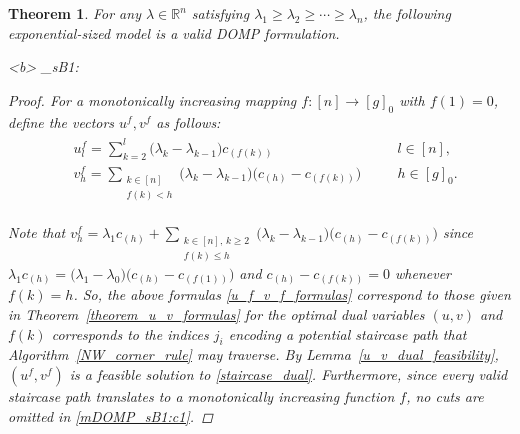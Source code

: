 \documentclass[letterpaper]{article}
\newtheorem{theorem}{Theorem}[section]
\begin{document}
\begin{theorem}\label{transport_domp_formulation}
    For any $\lambda \in \mathbb{R}^n$ satisfying $\lambda_1 \geq \lambda_2 \geq \cdots \geq \lambda_n$, the following exponential-sized model is a valid DOMP formulation.
    \begin{mini!}[2]<b>
        {}
        {\theta}
        {\label{mDOMP_sB1}}{_{sB1}:\,}
    \end{mini!}
    
    \begin{proof}
        For a monotonically increasing mapping $f: [n] \rightarrow [g]_0$ with $f(1) = 0$, define the vectors $u^f, v^f$ as follows:
        \begin{align}\label{u_f_v_f_formulas}
            \begin{alignedat}{2}
                &u^f_l = \sum_{k=2}^{l} \bigl( \lambda_k - \lambda_{k-1} \bigr) c_{(f(k))}& \quad &l \in [n],\\
                &v^f_{h} = \sum_{\substack{k \in [n] \\ f(k) < h}} \bigl( \lambda_{k} - \lambda_{k-1} \bigr) \bigl( c_{(h)} - c_{(f(k))} \bigr) & \quad &h \in [g]_0.
            \end{alignedat}
        \end{align}

        Note that $v^f_{h} = \lambda_1 c_{(h)} + \sum_{\substack{k \in [n], \, k \geq 2 \\ f(k) \leq h}} \bigl( \lambda_{k} - \lambda_{k-1} \bigr) \bigl( c_{(h)} - c_{(f(k))} \bigr)$ since $\lambda_1 c_{(h)} = \bigl( \lambda_{1} - \lambda_{0} \bigr) \bigl( c_{(h)} - c_{(f(1))} \bigr)$ and $c_{(h)} - c_{(f(k))} = 0$ whenever $f(k) = h$. So, the above formulas \eqref{u_f_v_f_formulas} correspond to those given in Theorem~\ref{theorem_u_v_formulas} for the optimal dual variables $(u, v)$ and $f(k)$ corresponds to the indices $j_i$ encoding a potential staircase path that Algorithm~\ref{NW_corner_rule} may traverse. By Lemma~\ref{u_v_dual_feasibility}, $(u^f, v^f)$ is a feasible solution to \eqref{staircase_dual}. Furthermore, since every valid staircase path translates to a monotonically increasing function $f$, no cuts are omitted in \eqref{mDOMP_sB1:c1}.
        

\end{proof}
\end{theorem}
\end{document}
